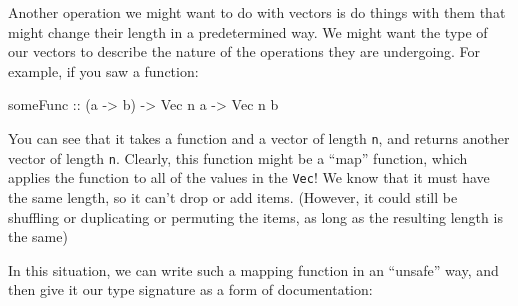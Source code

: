 \documentclass[]{article}
\newenvironment{Shaded}{}{}
\newcommand{\CommentTok}[1]{\textcolor[rgb]{0.38,0.63,0.69}{\textit{#1}}}
\newcommand{\DataTypeTok}[1]{\textcolor[rgb]{0.56,0.13,0.00}{#1}}
\newcommand{\FunctionTok}[1]{\textcolor[rgb]{0.02,0.16,0.49}{#1}}
\newcommand{\KeywordTok}[1]{\textcolor[rgb]{0.00,0.44,0.13}{\textbf{#1}}}
\newcommand{\NormalTok}[1]{#1}
\newcommand{\OperatorTok}[1]{\textcolor[rgb]{0.40,0.40,0.40}{#1}}
\newcommand{\OtherTok}[1]{\textcolor[rgb]{0.00,0.44,0.13}{#1}}
\begin{document}
Another operation we might want to do with vectors is do things with them that
might change their length in a predetermined way. We might want the type of our
vectors to describe the nature of the operations they are undergoing. For
example, if you saw a function:

\begin{Shaded}
\begin{Highlighting}[]
\OtherTok{someFunc ::}\NormalTok{ (a }\OtherTok{{-}\textgreater{}}\NormalTok{ b) }\OtherTok{{-}\textgreater{}} \DataTypeTok{Vec}\NormalTok{ n a }\OtherTok{{-}\textgreater{}} \DataTypeTok{Vec}\NormalTok{ n b}
\end{Highlighting}
\end{Shaded}

You can see that it takes a function and a vector of length \texttt{n}, and
returns another vector of length \texttt{n}. Clearly, this function might be a
``map'' function, which applies the function to all of the values in the
\texttt{Vec}! We know that it must have the same length, so it can't drop or add
items. (However, it could still be shuffling or duplicating or permuting the
items, as long as the resulting length is the same)

In this situation, we can write such a mapping function in an ``unsafe'' way,
and then give it our type signature as a form of documentation:

\begin{Shaded}
\end{Shaded}
\end{document}
